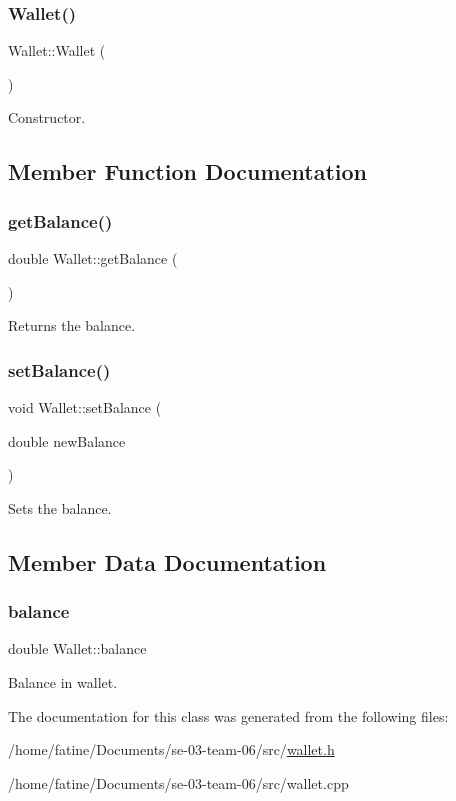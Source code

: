 \subsubsection{\texorpdfstring{Wallet()}{Wallet()}}
{\footnotesize\ttfamily Wallet\+::\+Wallet (\begin{DoxyParamCaption}{ }\end{DoxyParamCaption})}

Constructor. 

\subsection{Member Function Documentation}
\mbox{\label{classWallet_a87b3f7dec77a607a67df9c5d5503b3c6}} 
\subsubsection{\texorpdfstring{get\+Balance()}{getBalance()}}
{\footnotesize\ttfamily double Wallet\+::get\+Balance (\begin{DoxyParamCaption}{ }\end{DoxyParamCaption})}

Returns the balance. \mbox{\label{classWallet_a84887f86d53ddf090421365c8ac52661}} 
\subsubsection{\texorpdfstring{set\+Balance()}{setBalance()}}
{\footnotesize\ttfamily void Wallet\+::set\+Balance (\begin{DoxyParamCaption}\item[{double}]{new\+Balance }\end{DoxyParamCaption})}

Sets the balance. 

\subsection{Member Data Documentation}
\mbox{\label{classWallet_acb690105f6e130dac3c0dbd90e842d0a}} 
\subsubsection{\texorpdfstring{balance}{balance}}
{\footnotesize\ttfamily double Wallet\+::balance}

Balance in wallet. 

The documentation for this class was generated from the following files\+:\begin{DoxyCompactItemize}
\item 
/home/fatine/\+Documents/se-\/03-\/team-\/06/src/\hyperlink{wallet_8h}{wallet.\+h}\item 
/home/fatine/\+Documents/se-\/03-\/team-\/06/src/wallet.\+cpp\end{DoxyCompactItemize}
